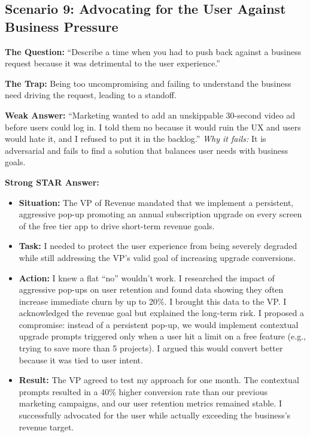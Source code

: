 \documentclass[
  11pt,
  openany,
  oneside]{book}
\providecommand{\tightlist}{%
  \setlength{\itemsep}{0pt}\setlength{\parskip}{0pt}}
\begin{document}
\subsection{Scenario 9: Advocating for the User Against Business
Pressure}\label{scenario-9-advocating-for-the-user-against-business-pressure}

\textbf{The Question:} ``Describe a time when you had to push back
against a business request because it was detrimental to the user
experience.''

\textbf{The Trap:} Being too uncompromising and failing to understand
the business need driving the request, leading to a standoff.

\textbf{Weak Answer:} ``Marketing wanted to add an unskippable 30-second
video ad before users could log in. I told them no because it would ruin
the UX and users would hate it, and I refused to put it in the
backlog.'' \emph{Why it fails:} It is adversarial and fails to find a
solution that balances user needs with business goals.

\textbf{Strong STAR Answer:}

\begin{itemize}
\tightlist
\item
  \textbf{Situation:} The VP of Revenue mandated that we implement a
  persistent, aggressive pop-up promoting an annual subscription upgrade
  on every screen of the free tier app to drive short-term revenue
  goals.
\item
  \textbf{Task:} I needed to protect the user experience from being
  severely degraded while still addressing the VP's valid goal of
  increasing upgrade conversions.
\item
  \textbf{Action:} I knew a flat ``no'' wouldn't work. I researched the
  impact of aggressive pop-ups on user retention and found data showing
  they often increase immediate churn by up to 20\%. I brought this data
  to the VP. I acknowledged the revenue goal but explained the long-term
  risk. I proposed a compromise: instead of a persistent pop-up, we
  would implement contextual upgrade prompts triggered only when a user
  hit a limit on a free feature (e.g., trying to save more than 5
  projects). I argued this would convert better because it was tied to
  user intent.
\item
  \textbf{Result:} The VP agreed to test my approach for one month. The
  contextual prompts resulted in a 40\% higher conversion rate than our
  previous marketing campaigns, and our user retention metrics remained
  stable. I successfully advocated for the user while actually exceeding
  the business's revenue target.
\end{itemize}
\end{document}
